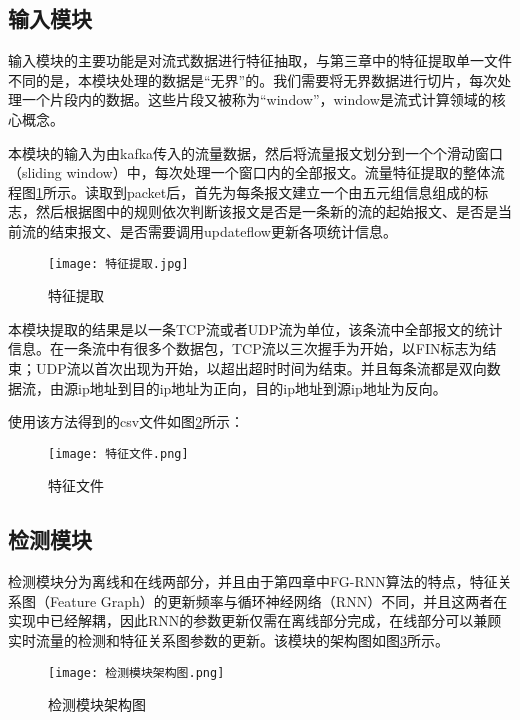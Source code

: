 \subsection{输入模块}
输入模块的主要功能是对流式数据进行特征抽取，与第三章中的特征提取单一文件不同的是，本模块处理的数据是“无界”的。我们需要将无界数据进行切片，每次处理一个片段内的数据。这些片段又被称为“window”，window是流式计算领域的核心概念。

本模块的输入为由kafka传入的流量数据，然后将流量报文划分到一个个滑动窗口（sliding window）中，每次处理一个窗口内的全部报文。流量特征提取的整体流程图\ref{fig:特征提取}所示。读取到packet后，首先为每条报文建立一个由五元组信息组成的标志，然后根据图中的规则依次判断该报文是否是一条新的流的起始报文、是否是当前流的结束报文、是否需要调用updateflow更新各项统计信息。

\begin{figure}
  \centering
  \texttt{[image: 特征提取.jpg]}
  \caption{特征提取}
  \label{fig:特征提取}
\end{figure}

本模块提取的结果是以一条TCP流或者UDP流为单位，该条流中全部报文的统计信息。在一条流中有很多个数据包，TCP流以三次握手为开始，以FIN标志为结束；UDP流以首次出现为开始，以超出超时时间为结束。并且每条流都是双向数据流，由源ip地址到目的ip地址为正向，目的ip地址到源ip地址为反向。

使用该方法得到的csv文件如图\ref{fig:特征文件}所示：
\begin{figure}
    \centering
    \texttt{[image: 特征文件.png]}
    \caption{特征文件}
    \label{fig:特征文件}
  \end{figure}


\subsection{检测模块}
检测模块分为离线和在线两部分，并且由于第四章中FG-RNN算法的特点，特征关系图（Feature Graph）的更新频率与循环神经网络（RNN）不同，并且这两者在实现中已经解耦，因此RNN的参数更新仅需在离线部分完成，在线部分可以兼顾实时流量的检测和特征关系图参数的更新。该模块的架构图如图\ref{fig:检测模块架构图}所示。
\begin{figure}
  \centering
  \texttt{[image: 检测模块架构图.png]}
  \caption{检测模块架构图}
  \label{fig:检测模块架构图}
\end{figure}


